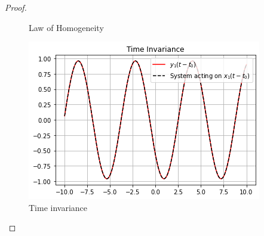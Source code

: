 \documentclass[journal,12pt,twocolumn]{IEEEtran}
\begin{document}
\begin{proof}
\begin{enumerate}
\begin{figure}[!ht]
 \caption{Law of Homogeneity}
 \end{figure}
  \begin{figure}[!ht]
\centering
 \includegraphics[width=\columnwidth]{graphs/time_invariance.png}
 \caption{Time invariance}
 \end{figure}
\end{enumerate}
\end{proof}
\end{document}
